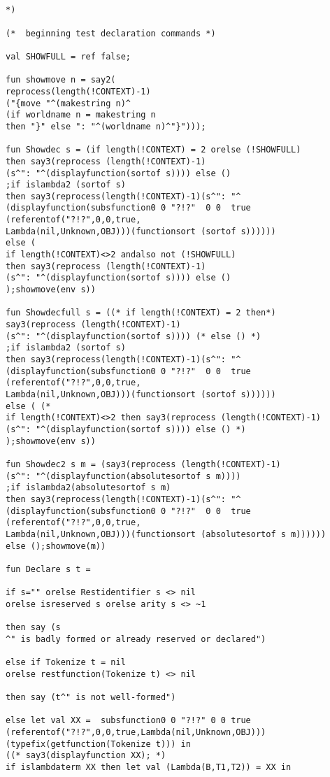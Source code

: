 \documentclass[12pt]{article}
\begin{document}
\begin{verbatim}


*)

(*  beginning test declaration commands *)

val SHOWFULL = ref false;

fun showmove n = say2(
reprocess(length(!CONTEXT)-1)
("{move "^(makestring n)^
(if worldname n = makestring n 
then "}" else ": "^(worldname n)^"}")));

fun Showdec s = (if length(!CONTEXT) = 2 orelse (!SHOWFULL)
then say3(reprocess (length(!CONTEXT)-1)
(s^": "^(displayfunction(sortof s)))) else ()
;if islambda2 (sortof s)
then say3(reprocess(length(!CONTEXT)-1)(s^": "^
(displayfunction(subsfunction0 0 "?!?"  0 0  true 
(referentof("?!?",0,0,true,
Lambda(nil,Unknown,OBJ)))(functionsort (sortof s))))))
else (
if length(!CONTEXT)<>2 andalso not (!SHOWFULL) 
then say3(reprocess (length(!CONTEXT)-1)
(s^": "^(displayfunction(sortof s)))) else ()
);showmove(env s))

fun Showdecfull s = ((* if length(!CONTEXT) = 2 then*)
say3(reprocess (length(!CONTEXT)-1)
(s^": "^(displayfunction(sortof s)))) (* else () *)
;if islambda2 (sortof s)
then say3(reprocess(length(!CONTEXT)-1)(s^": "^
(displayfunction(subsfunction0 0 "?!?"  0 0  true 
(referentof("?!?",0,0,true,
Lambda(nil,Unknown,OBJ)))(functionsort (sortof s))))))
else ( (*
if length(!CONTEXT)<>2 then say3(reprocess (length(!CONTEXT)-1)
(s^": "^(displayfunction(sortof s)))) else () *)
);showmove(env s))

fun Showdec2 s m = (say3(reprocess (length(!CONTEXT)-1)
(s^": "^(displayfunction(absolutesortof s m))))
;if islambda2(absolutesortof s m)
then say3(reprocess(length(!CONTEXT)-1)(s^": "^
(displayfunction(subsfunction0 0 "?!?"  0 0  true 
(referentof("?!?",0,0,true,
Lambda(nil,Unknown,OBJ)))(functionsort (absolutesortof s m))))))
else ();showmove(m))

fun Declare s t =

if s="" orelse Restidentifier s <> nil 
orelse isreserved s orelse arity s <> ~1

then say (s
^" is badly formed or already reserved or declared")

else if Tokenize t = nil 
orelse restfunction(Tokenize t) <> nil

then say (t^" is not well-formed")

else let val XX =  subsfunction0 0 "?!?" 0 0 true 
(referentof("?!?",0,0,true,Lambda(nil,Unknown,OBJ))) 
(typefix(getfunction(Tokenize t))) in
((* say3(displayfunction XX); *)
if islambdaterm XX then let val (Lambda(B,T1,T2)) = XX in


\end{verbatim}
\end{document}
